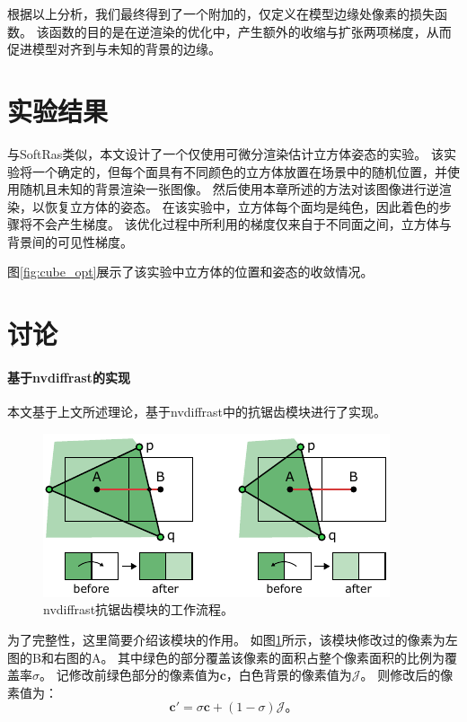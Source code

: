 根据以上分析，我们最终得到了一个附加的，仅定义在模型边缘处像素的损失函数。
该函数的目的是在逆渲染的优化中，产生额外的收缩与扩张两项梯度，从而促进模型对齐到与未知的背景的边缘。

\section{实验结果}

与SoftRas\citep{softras}类似，本文设计了一个仅使用可微分渲染估计立方体姿态的实验。
该实验将一个确定的，但每个面具有不同颜色的立方体放置在场景中的随机位置，并使用随机且未知的背景渲染一张图像。
然后使用本章所述的方法对该图像进行逆渲染，以恢复立方体的姿态。
在该实验中，立方体每个面均是纯色，因此着色的步骤将不会产生梯度。
该优化过程中所利用的梯度仅来自于不同面之间，立方体与背景间的可见性梯度。

图\ref{fig:cube_opt}展示了该实验中立方体的位置和姿态的收敛情况。

\section{讨论}
\label{sec:method_discuss}

\paragraph{基于nvdiffrast的实现}
本文基于上文所述理论，基于nvdiffrast\citep{nvdiffrast}中的抗锯齿模块进行了实现。

\begin{figure}
    \centering
    \includegraphics{figures/antialias}
    \caption[nvdiffrast抗锯齿模块的工作流程]{nvdiffrast抗锯齿模块的工作流程\citep{nvdiffrast}。}
    \label{fig:aa}
\end{figure}

为了完整性，这里简要介绍该模块的作用。
如图\ref{fig:aa}所示，该模块修改过的像素为左图的B和右图的A。
其中绿色的部分覆盖该像素的面积占整个像素面积的比例为覆盖率$\sigma$。
记修改前绿色部分的像素值为$\mathbf{c}$，白色背景的像素值为$\mathcal{J}$。
则修改后的像素值为：
\begin{equation}
\mathbf{c}' = \sigma\mathbf{c} + (1-\sigma)\mathcal{J}
\text{。}
\end{equation}

